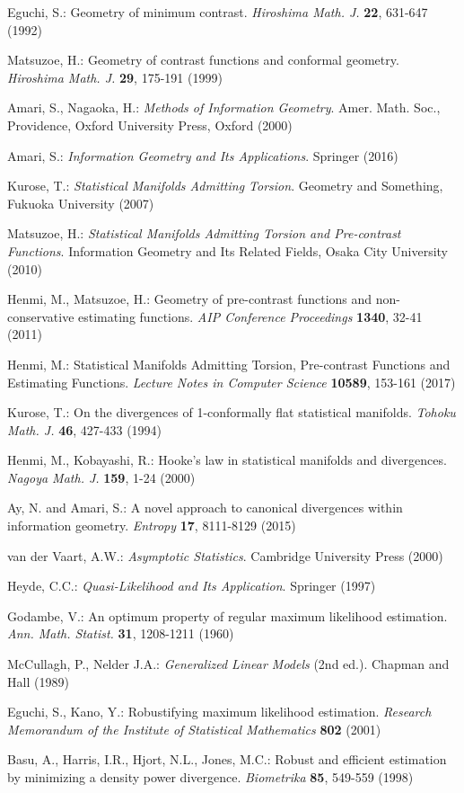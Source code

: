 \documentclass[graybox]{svmult}
\begin{document}
\begin{thebibliography}{99.}
%
Eguchi, S.:
Geometry of minimum contrast.
{\em Hiroshima Math. J.} \textbf{22}, 631-647 (1992)

Matsuzoe, H.:
Geometry of contrast functions and conformal geometry.
{\em Hiroshima Math. J.} \textbf{29}, 175-191 (1999)

Amari, S., Nagaoka, H.:
{\em Methods of Information Geometry}.
Amer. Math. Soc., Providence, Oxford University Press, Oxford (2000)

Amari, S.:
{\em Information Geometry and Its Applications}. Springer (2016)

Kurose, T.:
{\em Statistical Manifolds Admitting Torsion}.
Geometry and Something, Fukuoka University (2007)

Matsuzoe, H.:
{\em Statistical Manifolds Admitting Torsion and Pre-contrast Functions}.
Information Geometry and Its Related Fields, Osaka City University (2010)

Henmi, M., Matsuzoe, H.:
Geometry of pre-contrast functions and non-conservative estimating functions.
{\em AIP Conference Proceedings} \textbf{1340}, 32-41 (2011)

Henmi, M.:
Statistical Manifolds Admitting Torsion, Pre-contrast Functions and Estimating
Functions.
{\em Lecture Notes in Computer Science} \textbf{10589}, 153-161 (2017)

Kurose, T.:
On the divergences of 1-conformally flat statistical manifolds.
{\em Tohoku Math. J.} \textbf{46}, 427-433 (1994)

Henmi, M., Kobayashi, R.:
Hooke's law in statistical manifolds and divergences.
{\em Nagoya Math. J.} \textbf{159}, 1-24 (2000)

Ay, N. and Amari, S.:
A novel approach to canonical divergences within information geometry.
{\em Entropy} \textbf{17}, 8111-8129 (2015)

van der Vaart, A.W.:
{\em Asymptotic Statistics}.
Cambridge University Press (2000)

Heyde, C.C.:
{\em Quasi-Likelihood and Its Application}. Springer (1997)

Godambe, V.:
An optimum property of regular maximum likelihood estimation.
{\em Ann. Math. Statist.} \textbf{31}, 1208-1211 (1960)

McCullagh, P., Nelder J.A.:
{\em Generalized Linear Models} (2nd ed.).
Chapman and Hall (1989)

Eguchi, S., Kano, Y.:
Robustifying maximum likelihood estimation.
{\em Research Memorandum of the Institute of Statistical Mathematics}
\textbf{802} (2001)

Basu, A., Harris, I.R., Hjort, N.L., Jones, M.C.:
Robust and efficient estimation by minimizing a density power divergence.
{\em Biometrika} \textbf{85}, 549-559 (1998)
%
\end{thebibliography}
\end{document}
